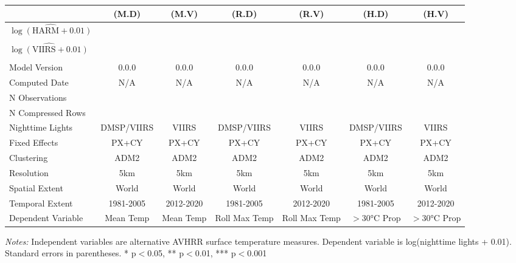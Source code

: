 \begin{table}[htbp]
\centering
\footnotesize
\begin{tabular}{lcccccc}
\toprule
 & (M.D) & (M.V) & (R.D) & (R.V) & (H.D) & (H.V) \\
\midrule
$\hat{\log(\text{HARM} + 0.01)}$ &  &  &  &  &  &  \\
 &  &  &  &  &  &  \\
$\hat{\log(\text{VIIRS} + 0.01)}$ &  &  &  &  &  &  \\
 &  &  &  &  &  &  \\
\midrule
Model Version & 0.0.0 & 0.0.0 & 0.0.0 & 0.0.0 & 0.0.0 & 0.0.0 \\
Computed Date & N/A & N/A & N/A & N/A & N/A & N/A \\
N Observations &  &  &  &  &  &  \\
N Compressed Rows &  &  &  &  &  &  \\
\midrule
Nighttime Lights & DMSP/VIIRS & VIIRS & DMSP/VIIRS & VIIRS & DMSP/VIIRS & VIIRS \\
Fixed Effects & PX+CY & PX+CY & PX+CY & PX+CY & PX+CY & PX+CY \\
Clustering & ADM2 & ADM2 & ADM2 & ADM2 & ADM2 & ADM2 \\
Resolution & 5km & 5km & 5km & 5km & 5km & 5km \\
Spatial Extent & World & World & World & World & World & World \\
Temporal Extent & 1981-2005 & 2012-2020 & 1981-2005 & 2012-2020 & 1981-2005 & 2012-2020 \\
Dependent Variable & Mean Temp & Mean Temp & Roll Max Temp & Roll Max Temp & $>$30°C Prop & $>$30°C Prop \\
\bottomrule
\end{tabular}
\begin{threeparttable}
\begin{tablenotes}\small
\item \textit{Notes:} Independent variables are alternative AVHRR surface temperature measures. Dependent variable is log(nighttime lights + 0.01). Standard errors in parentheses. * p$<$0.05, ** p$<$0.01, *** p$<$0.001
\end{tablenotes}
\end{threeparttable}
\end{table}